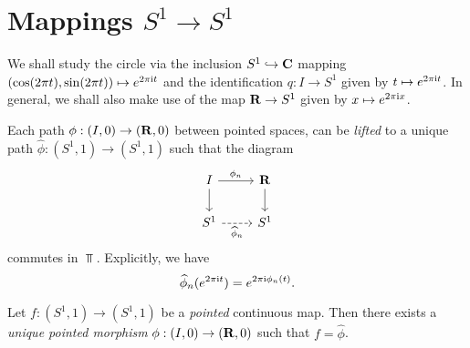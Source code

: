 

\section{Mappings \texorpdfstring{\(S^1 \longrightarrow S^1\)}{S1 -> S1}}

We shall study the circle via the inclusion \(S^1 \hookrightarrow \mathbf{C}\) mapping
\((\cos(2 \pi t), \sin(2 \pi t)) \mapsto e^{2 \pi \text{i} t}\) and the
identification \(q: I \to S^1\) given by \(t \mapsto e^{2 \pi \text{i} t}\). In
general, we shall also make use of the map \(\mathbf{R} \to S^1\) given by
\(x \mapsto e^{2 \pi \text{i} x}\).

Each path \(\phi: (I, 0) \to (\mathbf{R}, 0)\) between pointed spaces, can be
\emph{lifted} to a unique path \(\widehat \phi: (S^1, 1) \to (S^1, 1)\) such
that the diagram
\[
\begin{tikzcd}
I \ar[r, "\phi_n"] \ar[d] &\R \ar[d] \\
S^1 \ar[r, dashed, "\widehat \phi_n"'] &S^1
\end{tikzcd}
\]
commutes in \(\Top\). Explicitly, we have
\[
\widehat \phi_n(e^{2 \pi \text{i} t}) = e^{2 \pi \text{i} \phi_n(t)}.
\]

\begin{proposition}
\label{prop:unwinding-pointed-maps}
Let \(f: (S^1, 1) \to (S^1, 1)\) be a \emph{pointed} continuous map. Then there
exists a \emph{unique pointed morphism} \(\phi: (I, 0) \to (\mathbf{R}, 0)\) such that
\(f = \widehat \phi\).
\end{proposition}

